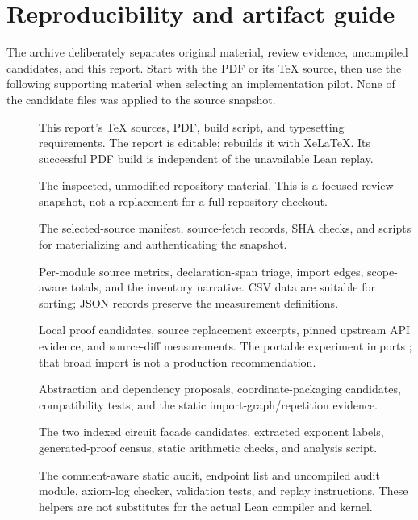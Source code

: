 \majorbreak
\appendix
\section{Reproducibility and artifact guide}

The archive deliberately separates original material, review evidence,
uncompiled candidates, and this report. Start with the PDF or its TeX source,
then use the following supporting material when selecting an implementation
pilot. None of the candidate files was applied to the source snapshot.

\begin{description}
\item[]
This report's TeX sources, PDF, build script, and typesetting requirements.
The report is editable;  rebuilds it with XeLaTeX. Its
successful PDF build is independent of the unavailable Lean replay.
\item[]
The inspected, unmodified repository material. This is a focused review
snapshot, not a replacement for a full repository checkout.
\item[]
The selected-source manifest, source-fetch records, SHA checks, and scripts
for materializing and authenticating the snapshot.
\item[]
Per-module source metrics, declaration-span triage, import edges, scope-aware
totals, and the inventory narrative. CSV data are suitable for sorting;
JSON records preserve the measurement definitions.
\item[]
Local proof candidates, source replacement excerpts, pinned upstream API
evidence, and source-diff measurements. The portable experiment imports
; that broad import is not a production recommendation.
\item[]
Abstraction and dependency proposals, coordinate-packaging candidates,
compatibility tests, and the static import-graph/repetition evidence.
\item[]
The two indexed circuit facade candidates, extracted exponent labels,
generated-proof census, static arithmetic checks, and analysis script.
\item[]
The comment-aware static audit, endpoint list and uncompiled audit module,
axiom-log checker, validation tests, and replay instructions. These helpers
are not substitutes for the actual Lean compiler and kernel.
\end{description}

